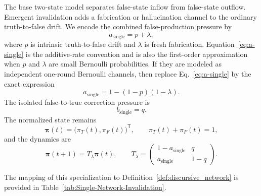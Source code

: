 \documentclass[12pt]{article}
\theoremstyle{definition}
\begin{document}
The base two-state model separates false-state inflow from false-state outflow.
Emergent invalidation adds a fabrication or hallucination channel to the
ordinary truth-to-false drift.  We encode the combined false-production pressure
by
\begin{equation}\label{eq:a-single}
    a_{\mathrm{single}}=p+\lambda,
\end{equation}
where $p$ is intrinsic truth-to-false drift and $\lambda$ is fresh fabrication.
Equation~\eqref{eq:a-single} is the additive-rate convention and is also the
first-order approximation when $p$ and $\lambda$ are small Bernoulli
probabilities.  If they are modeled as independent one-round Bernoulli channels,
then replace Eq.~\eqref{eq:a-single} by the exact expression
\[
    a_{\mathrm{single}}=1-(1-p)(1-\lambda).
\]
The isolated false-to-true correction pressure is
\begin{equation}\label{eq:b-single}
    b_{\mathrm{single}}=q.
\end{equation}
The normalized state remains
\[
\boldsymbol{\pi}(t)=\bigl(\pi_T(t),\pi_F(t)\bigr)^{\mathsf T},
\qquad \pi_T(t)+\pi_F(t)=1,
\]
and the dynamics are
\begin{equation}\label{eq:single-lambda-matrix}
\boldsymbol{\pi}(t+1)=T_{\lambda}\boldsymbol{\pi}(t),\qquad
T_{\lambda}=\begin{pmatrix}
1-a_{\mathrm{single}} & q\\
a_{\mathrm{single}} & 1-q
\end{pmatrix}.
\end{equation}

The mapping of this specialization to Definition~\ref{def:discursive_network}
is provided in Table~\ref{tab:Single-Network-Invalidation}.
\end{document}
